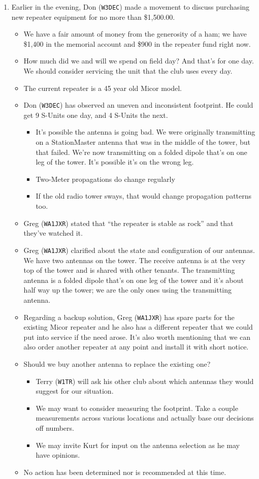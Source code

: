 \documentclass[10pt,letterpaper]{article}
\begin{document}
\begin{enumerate}
\item Earlier in the evening, Don (\texttt{W3DEC}) made a movement to discuss purchasing new repeater equipment for no more than \$1,500.00.
\begin{itemize}
\item We have a fair amount of money from the generosity of a ham; we have \$1,400 in the memorial account and \$900 in the repeater fund right now.
\item How much did we and will we spend on field day? And that's for one day. We should consider servicing the unit that the club uses every day.
\item The current repeater is a 45 year old Micor model.
\item Don (\texttt{W3DEC}) has observed an uneven and inconsistent footprint. He could get 9 S-Units one day, and 4 S-Units the next.
\begin{itemize}
\item It's possible the antenna is going bad. We were originally transmitting on a StationMaster antenna that was in the middle of the tower, but that failed. We're now transmitting on a folded dipole that's on one leg of the tower. It's possible it's on the wrong leg.
\item Two-Meter propagations do change regularly
\item If the old radio tower sways, that would change propagation patterns too.
\end{itemize}
\item Greg (\texttt{WA1JXR}) stated that ``the repeater is stable as rock'' and that they've watched it.
\item Greg (\texttt{WA1JXR}) clarified about the state and configuration of our antennas. We have two antennas on the tower. The receive antenna is at the very top of the tower and is shared with other tenants. The transmitting antenna is a folded dipole that's on one leg of the tower and it's about half way up the tower; we are the only ones using the transmitting antenna.
\item Regarding a backup solution, Greg (\texttt{WA1JXR}) has spare parts for the existing Micor repeater and he also has a different repeater that we could put into service if the need arose. It's also worth mentioning that we can also order another repeater at any point and install it with short notice.
\item Should we buy another antenna to replace the existing one?
\begin{itemize}
\item Terry (\texttt{W1TR}) will ask his other club about which antennas they would suggest for our situation.
\item We may want to consider measuring the footprint. Take a couple measurements across various locations and actually base our decisions off numbers.
\item We may invite Kurt for input on the antenna selection as he may have opinions.
\end{itemize}
\item No action has been determined nor is recommended at this time.
\end{itemize}
\end{enumerate}
\end{document}
